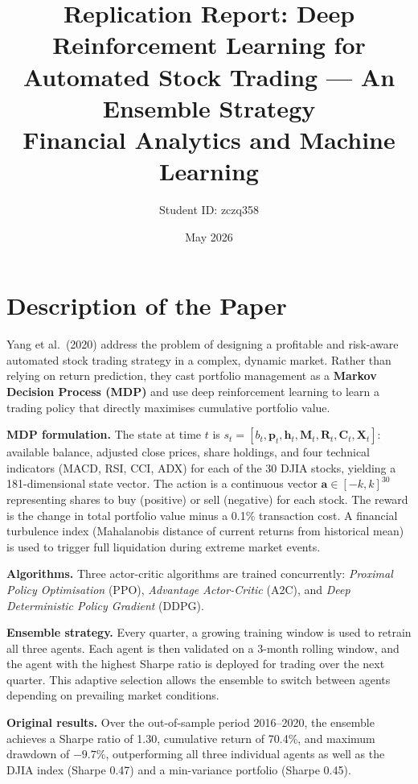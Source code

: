 \documentclass[11pt,a4paper]{article}
\title{\textbf{Replication Report: Deep Reinforcement Learning for\\
Automated Stock Trading --- An Ensemble Strategy}\\[0.5em]
\large Financial Analytics and Machine Learning}
\author{Student ID: zczq358}
\date{May 2026}
\begin{document}
\maketitle
\thispagestyle{empty}

\section{Description of the Paper}

Yang et al.\ (2020) address the problem of designing a profitable and
risk-aware automated stock trading strategy in a complex, dynamic market.
Rather than relying on return prediction, they cast portfolio management as a
\textbf{Markov Decision Process (MDP)} and use deep reinforcement learning to
learn a trading policy that directly maximises cumulative portfolio value.

\textbf{MDP formulation.}
The state at time $t$ is $s_t = [b_t, \mathbf{p}_t, \mathbf{h}_t, \mathbf{M}_t,
\mathbf{R}_t, \mathbf{C}_t, \mathbf{X}_t]$: available balance, adjusted close
prices, share holdings, and four technical indicators (MACD, RSI, CCI, ADX)
for each of the 30 DJIA stocks, yielding a 181-dimensional state vector.
The action is a continuous vector $\mathbf{a}\in[-k,k]^{30}$ representing
shares to buy (positive) or sell (negative) for each stock.
The reward is the change in total portfolio value minus a 0.1\% transaction
cost. A financial turbulence index (Mahalanobis distance of current returns
from historical mean) is used to trigger full liquidation during extreme market
events.

\textbf{Algorithms.}
Three actor-critic algorithms are trained concurrently: \textit{Proximal Policy
Optimisation} (PPO), \textit{Advantage Actor-Critic} (A2C), and
\textit{Deep Deterministic Policy Gradient} (DDPG).

\textbf{Ensemble strategy.}
Every quarter, a growing training window is used to retrain all three agents.
Each agent is then validated on a 3-month rolling window, and the agent with
the highest Sharpe ratio is deployed for trading over the next quarter. This
adaptive selection allows the ensemble to switch between agents depending on
prevailing market conditions.

\textbf{Original results.}
Over the out-of-sample period 2016--2020, the ensemble achieves a Sharpe ratio
of 1.30, cumulative return of 70.4\%, and maximum drawdown of $-9.7\%$,
outperforming all three individual agents as well as the DJIA index (Sharpe
0.47) and a min-variance portfolio (Sharpe 0.45).
\end{document}
